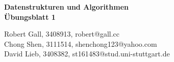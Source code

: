 \documentclass[12pt,a4paper]{article}
\begin{document}
\begin{titlepage}
	\begin{center}
	\LARGE \textbf{Datenstrukturen und Algorithmen}\\
	[0.5in]
	\Large \textbf{\"Ubungsblatt 1}\\
	[15cm]
	\end{center}
	\begin{flushright}
	\noindent Robert Gall, 3408913, robert@gall.cc\\
		       Chong Shen, 3111514, shenchong123@yahoo.com\\
		       David Lieb, 3408382, st161483@stud.uni-stuttgart.de\\
	\end{flushright}

\end{titlepage}


\newpage
\end{document}
